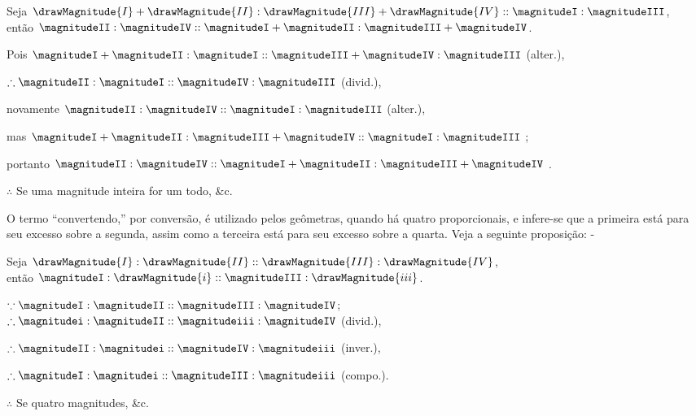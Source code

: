 \documentclass[booklanguage=brazilian]{byrnebook}
\begin{document}
\begin{center}
Seja $\drawMagnitude{I} + \drawMagnitude{II} : \drawMagnitude{III} + \drawMagnitude{IV} :: \magnitudeI : \magnitudeIII$,\\
então $\magnitudeII : \magnitudeIV :: \magnitudeI + \magnitudeII : \magnitudeIII + \magnitudeIV$.

Pois $\magnitudeI + \magnitudeII : \magnitudeI :: \magnitudeIII + \magnitudeIV : \magnitudeIII$ (alter.),

$\therefore \magnitudeII : \magnitudeI :: \magnitudeIV : \magnitudeIII$ (divid.),

novamente $\magnitudeII : \magnitudeIV :: \magnitudeI : \magnitudeIII$ (alter.),

mas $\magnitudeI + \magnitudeII : \magnitudeIII + \magnitudeIV :: \magnitudeI : \magnitudeIII$ \byref{\hypref};

portanto $\magnitudeII : \magnitudeIV :: \magnitudeI + \magnitudeII : \magnitudeIII + \magnitudeIV$ .

$\therefore$ Se uma magnitude inteira for um todo, \&c.
\end{center}

\label{def:V.XVII}
O termo \enquote{convertendo,} por conversão, é utilizado pelos geômetras, quando há quatro proporcionais, e infere-se que a primeira está para seu excesso sobre a segunda, assim como a terceira está para seu excesso sobre a quarta. Veja a seguinte proposição: -

\vfill\pagebreak

\label{prop:V.E} %

\begin{center}
Seja $\drawMagnitude{I} : \drawMagnitude{II} :: \drawMagnitude{III} : \drawMagnitude{IV}$,\\
então $\magnitudeI : \drawMagnitude{i} :: \magnitudeIII : \drawMagnitude{iii}$.

$\because \magnitudeI : \magnitudeII :: \magnitudeIII : \magnitudeIV$;\\ %
$\therefore \magnitudei : \magnitudeII :: \magnitudeiii : \magnitudeIV$ (divid.), %

$\therefore \magnitudeII : \magnitudei :: \magnitudeIV : \magnitudeiii$ (inver.),

$\therefore \magnitudeI : \magnitudei :: \magnitudeIII : \magnitudeiii$ (compo.).

$\therefore$ Se quatro magnitudes, \&c.
\end{center}
\end{document}

